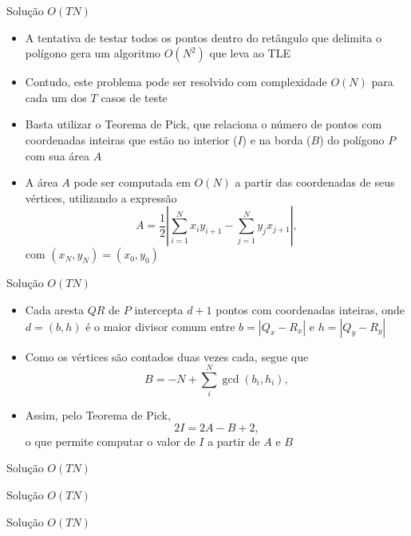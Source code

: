 \begin{frame}[fragile]{Solução $O(TN)$}

    \begin{itemize}
        \item A tentativa de testar todos os pontos dentro do retângulo que delimita o
            polígono gera um algoritmo $O(N^2)$ que leva ao TLE
        \pause

        \item Contudo, este problema pode ser resolvido com complexidade $O(N)$ para cada um dos
            $T$ casos de teste
        \pause

        \item Basta utilizar o Teorema de Pick, que relaciona o número de pontos com coordenadas
            inteiras que estão no interior ($I$) e na borda ($B$) do polígono $P$ com sua
            área $A$
        \pause

        \item A área $A$ pode ser computada em $O(N)$ a partir das coordenadas de seus vértices,
            utilizando a expressão
        \[
            A = \frac{1}{2}\left|\sum_{i = 1}^{N} x_iy_{i + 1} -
            \sum_{j = 1}^{N} y_jx_{j + 1}\right|,
        \]
        com $(x_N, y_N) = (x_0, y_0)$

   \end{itemize}

\end{frame}

\begin{frame}[fragile]{Solução $O(TN)$}

    \begin{itemize}
        \item Cada aresta $QR$ de $P$ intercepta $d + 1$ pontos com coordenadas inteiras,
            onde $d = (b, h)$ é o maior divisor comum entre $b = |Q_x - R_x|$ e $h = |Q_y - R_y|$
        \pause

        \item Como os vértices são contados duas vezes cada, segue que
        \[
            B = -N + \sum_i^N \gcd(b_i, h_i),
        \]
        \pause
        
        \item Assim, pelo Teorema de Pick,
        \[
            2I = 2A - B + 2,
        \]
        o que permite computar o valor de $I$ a partir de $A$ e $B$
    \end{itemize}

\end{frame}

\begin{frame}[fragile]{Solução $O(TN)$}
\end{frame}

\begin{frame}[fragile]{Solução $O(TN)$}
\end{frame}

\begin{frame}[fragile]{Solução $O(TN)$}
\end{frame}
